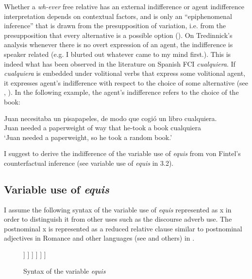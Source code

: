 \documentclass[output=paper]{langsci/langscibook}
\begin{document}
Whether a \textit{wh-ever} free relative has an external indifference or agent indifference interpretation depends on contextual factors, and is only an “epiphenomenal inference” that is drawn from the presupposition of variation, i.e. from the presupposition that every alternative is a possible option (\citealt[108]{Tredinnick2005}). On Tredinnick’s analysis whenever there is no overt expression of an agent, the indifference is speaker related (e.g. I blurted out whatever came to my mind first.). This is indeed what has been observed in the literature on Spanish FCI \textit{cualquiera}. If \textit{cualquiera} is embedded under volitional verbs that express some volitional agent, it expresses agent's indifference with respect to the choice of some alternative (see \citealt{CR2008}, \citealt{AM2011}). In the following example, the agent’s indifference refers to the choice of the book:

\ea\label{ex:kellert:38}
\gll Juan necesitaba un pisapapeles, de modo que cogió un libro cualquiera.\\
Juan needed a paperweight of way that he-took a book cualquiera\\
\glt ‘Juan needed a paperweight, so he took a random book.’
\z

I suggest to derive the indifference of the variable use of \textit{equis} from von Fintel's counterfactual inference (see variable use of \textit{equis} in 3.2).

\subsection{Variable use of \textit{equis}}\label{sec:kellert:3.2}
I assume the following syntax of the variable use of \textit{equis} represented as x in order to distinguish it from other uses such as the discourse adverb use. The postnominal x is represented as a reduced relative clause similar to postnominal adjectives in Romance and other languages (see \citealt{Cinque:2010} and others) in .\pagebreak


\begin{figure}
	\begin{forest}
		[DP
			[D\\\textit{un}\\`a'] [NP
				[NP\\\textit{nombre}\\`name'] [CP
					[C\\(\textit{que})\\`that'] [TP
						[T\\(\textit{es})\\`is'] [VP
							[~] [NP [$X$,roof]]
						]
					]
				]
			]
		]
	\end{forest}
	\caption{Syntax of the variable \textit{equis}\label{fig:kellert:tree1n}}

\end{figure}
\end{document}
